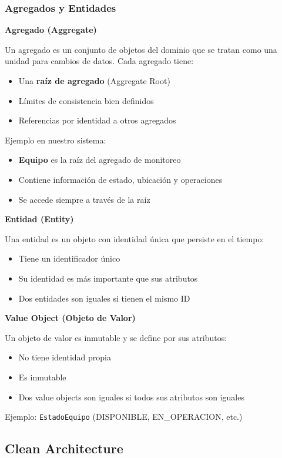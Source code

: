 \documentclass[12pt,a4paper]{article}
\begin{document}
\subsubsection{Agregados y Entidades}

\textbf{Agregado (Aggregate)}

Un agregado es un conjunto de objetos del dominio que se tratan como una unidad para cambios de datos. Cada agregado tiene:
\begin{itemize}
    \item Una \textbf{raíz de agregado} (Aggregate Root)
    \item Límites de consistencia bien definidos
    \item Referencias por identidad a otros agregados
\end{itemize}

Ejemplo en nuestro sistema:
\begin{itemize}
    \item \textbf{Equipo} es la raíz del agregado de monitoreo
    \item Contiene información de estado, ubicación y operaciones
    \item Se accede siempre a través de la raíz
\end{itemize}

\textbf{Entidad (Entity)}

Una entidad es un objeto con identidad única que persiste en el tiempo:
\begin{itemize}
    \item Tiene un identificador único
    \item Su identidad es más importante que sus atributos
    \item Dos entidades son iguales si tienen el mismo ID
\end{itemize}

\textbf{Value Object (Objeto de Valor)}

Un objeto de valor es inmutable y se define por sus atributos:
\begin{itemize}
    \item No tiene identidad propia
    \item Es inmutable
    \item Dos value objects son iguales si todos sus atributos son iguales
\end{itemize}

Ejemplo: \texttt{EstadoEquipo} (DISPONIBLE, EN\_OPERACION, etc.)

\subsection{Clean Architecture}
\end{document}
